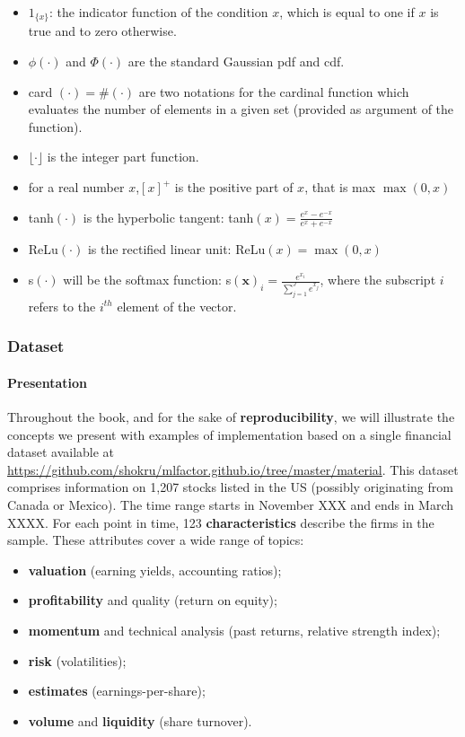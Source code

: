 \begin{itemize}
\item $1_{\{x \}}$: the indicator function of the condition $x$, which is equal to one if $x$
is true and to zero otherwise.
\item $\phi(\cdot)$ and $\Phi(\cdot)$ are the standard Gaussian pdf and cdf.
\item card $(\cdot)=\#(\cdot)$ are two notations for the cardinal function which evaluates the number of elements in a given set (provided as argument of the function).
\item $\lfloor \cdot \rfloor$ is the integer part function.
\item for a real number $x$,$[x]^+$
is the positive part of $x$, that is max $\max(0,x)$
\item tanh$(\cdot)$ is the hyperbolic tangent: tanh$(x)=\frac{e^x -e^{ -x}}{e^x+e^{ -x}}$
\item ReLu$(\cdot)$ is the rectified linear unit: ReLu$(x)=\max(0,x)$
\item s$(\cdot)$ will be the softmax function: s$(\textbf{x})_i=\frac{e^{x_i}}{\sum_{j=1}^Je^{x_j}}$, where the subscript $i$ refers to the $i^{th}$ element of the vector.
\end{itemize}

\subsubsection{Dataset}

\paragraph{Presentation}

Throughout the book, and for the sake of \textbf{reproducibility}, we will illustrate the concepts we present with examples of implementation based on a single financial dataset available at \href{https://github.com/shokru/mlfactor.github.io/tree/master/material}{https://github.com/shokru/mlfactor.github.io/tree/master/material}. This dataset comprises information on 1,207 stocks listed in the US (possibly originating from Canada or Mexico). The time range starts in November XXX and ends in March XXXX. For each point in time, 123 \textbf{characteristics} describe the firms in the sample. These attributes cover a wide range of topics:

\begin{itemize}
\item \textbf{valuation} (earning yields, accounting ratios);
\item \textbf{profitability} and quality (return on equity);
\item \textbf{momentum} and technical analysis (past returns, relative strength index);
\item \textbf{risk} (volatilities);
\item \textbf{estimates} (earnings-per-share);
\item \textbf{volume} and \textbf{liquidity} (share turnover).
\end{itemize}

